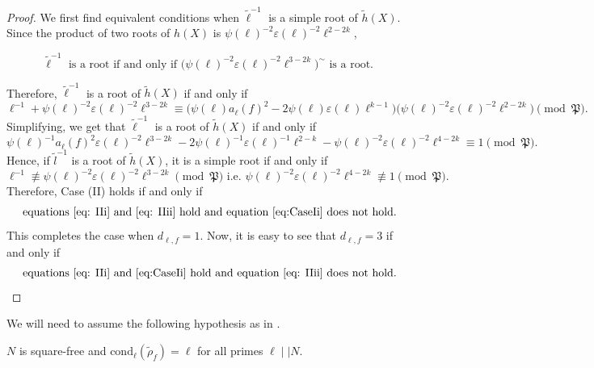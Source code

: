 \documentclass{amsart}
\newtheorem{auxiliary proposition}[theorem]{Auxiliary Proposition}
\newtheorem{main conjecture}[theorem]{Main Conjecture}
\newtheorem{main theorem}[theorem]{Main Theorem}
\newtheorem{modesty proposition}[theorem]{Modesty Proposition}
\newtheorem{open problem}[theorem]{Open Problem}
\newtheorem{convergence lemma}[theorem]{Convergence Lemma}
\newtheorem{corrected lemma}[theorem]{Corrected Lemma}
\newtheorem{growth lemma}[theorem]{Growth Lemma}
\newtheorem{coefficient lemma}[theorem]{Integrality Lemma}
\newtheorem{interpolation lemma}[theorem]{Interpolation Lemma}
\newtheorem{kernel lemma}[theorem]{Kernel Lemma}
\newtheorem{limit lemma}[theorem]{Limit Lemma}
\newtheorem{tandem lemma}[theorem]{Modesty Lemma}
\newtheorem{zero-finding lemma}[theorem]{Zero-Finding Lemma}
\begin{document}
\begin{proof}
 We first find equivalent conditions when $\tilde{\ell}^{-1}$ is a simple root of $\tilde{h}(X)$. Since the product of two roots of $h(X)$ is $\psi(\ell)^{-2}\varepsilon(\ell)^{-2}\ell^{2-2k}$, 

    $$\tilde{\ell}^{-1} \text{ is a  root if and only if } \Big(\psi(\ell)^{-2}\varepsilon(\ell)^{-2}\ell^{3-2k}\Big)^{\sim} \text{ is a root. }$$

Therefore, $\tilde{\ell}^{-1}$ is a root of $\tilde{h}(X)$ if and only if 
$$\ell^{-1} + \psi(\ell)^{-2}\varepsilon(\ell)^{-2}\ell^{3-2k} \equiv \big(\psi(\ell)a_\ell(f)^2-2\psi(\ell)\varepsilon(\ell)\ell^{k-1}\big)\big(\psi(\ell)^{-2}\varepsilon(\ell)^{-2}\ell^{2-2k}\big) \pmod{\mathfrak{P}}.$$ Simplifying, we get that $\tilde{\ell}^{-1}$ is a root of $\tilde{h}(X)$ if and only if  
\begin{equation}\label{eq: IIi}
   \psi(\ell)^{-1}a_\ell(f)^2\varepsilon(\ell)^{-2}\ell^{3-2k}-2\psi(\ell)^{-1}\varepsilon(\ell)^{-1}\ell^{2-k}-\psi(\ell)^{-2}\varepsilon(\ell)^{-2}\ell^{4-2k} \equiv 1 \pmod{\mathfrak{P}}.
\end{equation}
Hence, if $\tilde{l}^{-1}$ is a root of $\tilde{h}(X)$, it is a simple root  if and only if 
\begin{equation}\label{eq: IIii}
    \ell^{-1}\not\equiv \psi(\ell)^{-2}\varepsilon(\ell)^{-2}\ell^{3-2k} \pmod{\mathfrak{P}} \text{ i.e. } \psi(\ell)^{-2}\varepsilon(\ell)^{-2}\ell^{4-2k} \not\equiv 1 \pmod{\mathfrak{P}}.
\end{equation}
Therefore, Case (II) holds if and only if 
\begin{equation}\label{CaseII}
   \text{equations } \eqref{eq: IIi}  \text{  and } \eqref{eq: IIii} \text{ hold  and equation } \eqref{eq:CaseIi} \text{ does not hold.}
\end{equation}
This completes the case when $d_{\ell,f}=1$. Now, it is easy to see that $d_{\ell,f}=3$ if and only if 
\begin{equation}\label{CaseIII}
    \text{equations } \eqref{eq: IIi}  \text{  and } \eqref{eq:CaseIi} \text{ hold  and equation } \eqref{eq: IIii} \text{ does not hold.}
\end{equation}
\end{proof}

We will  need to assume the following hypothesis as in \cite[Proposition 3.3 or Theorem 3.1]{JhaMajumdarShekhar}.

\vspace{.2cm}

 $N$ is square-free and $\mathrm{cond}_\ell(\tilde{\rho}_f)=\ell$ for all primes $\ell \mid \mid N$.
\end{document}
